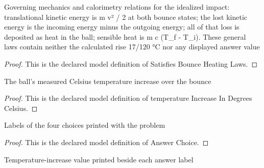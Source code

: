 \begin{definition}
  \label{def:physics:phyx-mini-0490:phyxminiproblems-problemphyxmini0490-satisfiesbounceheatinglaws}
  Governing mechanics and calorimetry relations for the idealized impact: translational kinetic energy is m v² / 2 at both bounce states; the lost kinetic energy is the incoming energy minus the outgoing energy; all of that loss is deposited as heat in the ball; sensible heat is m c (T\_f - T\_i). These general laws contain neither the calculated rise 17/120 °C nor any displayed answer value
\end{definition}
\begin{proof}
  This is the declared model definition of Satisfies Bounce Heating Laws.
\end{proof}
\begin{definition}
  \label{def:physics:phyx-mini-0490:phyxminiproblems-problemphyxmini0490-temperatureincreaseindegreescelsius}
  The ball's measured Celsius temperature increase over the bounce
\end{definition}
\begin{proof}
  This is the declared model definition of temperature Increase In Degrees Celsius.
\end{proof}
\begin{definition}
  \label{def:physics:phyx-mini-0490:phyxminiproblems-problemphyxmini0490-answerchoice}
  Labels of the four choices printed with the problem
\end{definition}
\begin{proof}
  This is the declared model definition of Answer Choice.
\end{proof}
\begin{definition}
  \label{def:physics:phyx-mini-0490:phyxminiproblems-problemphyxmini0490-displayedtemperatureincreaseindegreescelsius}
  Temperature-increase value printed beside each answer label
\end{definition}
